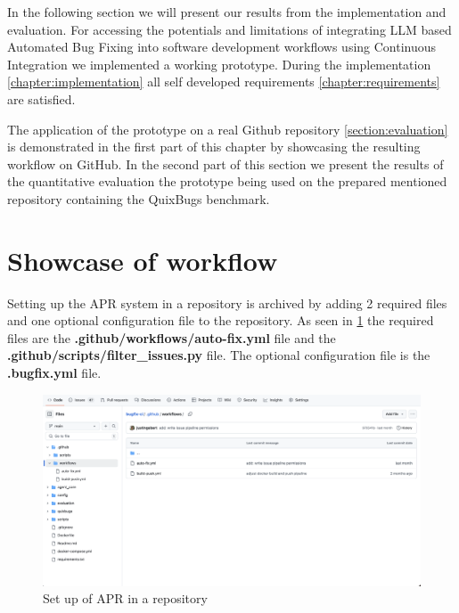 In the following section we will present our results from the implementation and evaluation. For accessing the potentials and limitations of integrating LLM based Automated Bug Fixing into software development workflows using Continuous Integration we implemented a working prototype. During the implementation \ref{chapter:implementation} all self developed requirements \ref{chapter:requirements} are satisfied.

The application of the prototype on a real Github repository \ref{section:evaluation} is demonstrated in the first part of this chapter by showcasing the resulting workflow on GitHub. In the second part of this section we  present the results of the quantitative evaluation the prototype being used on the prepared mentioned repository containing the QuixBugs benchmark.

\section{Showcase of workflow}
Setting up the APR system in a repository is archived by adding 2 required files and one optional configuration file to the repository. As seen in \ref{fig:setup} the required files are the \textbf{.github/workflows/auto-fix.yml} file and the \textbf{.github/scripts/filter\_issues.py} file. The optional configuration file is the \textbf{.bugfix.yml} file.

\begin{figure}[H]
    \centering
    \includegraphics[width=1\textwidth]{images/workflow/setup.png}
    \caption{Set up of APR in a repository}
    \label{fig:setup}
\end{figure}

